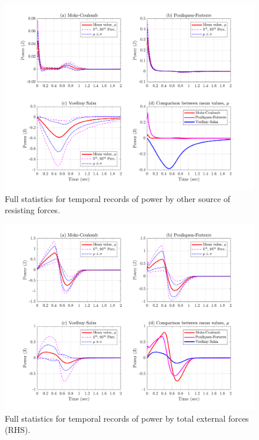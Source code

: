 \documentclass{article}
\begin{document}
\begin{figure}[H]
        \centering
        \includegraphics[width=1\textwidth]{InclinedPlane/GlobalRecords/Pres.png}
        \caption{Full statistics for temporal records of power by other source of resisting forces.}
        \label{fig:Ramp-Pres}
\end{figure}

\begin{figure}[H]
        \centering
        \includegraphics[width=1\textwidth]{InclinedPlane/GlobalRecords/PRHS.png}
        \caption{Full statistics for temporal records of power by total external forces (RHS).}
        \label{fig:Ramp-Ptotal}
\end{figure}
\end{document}
